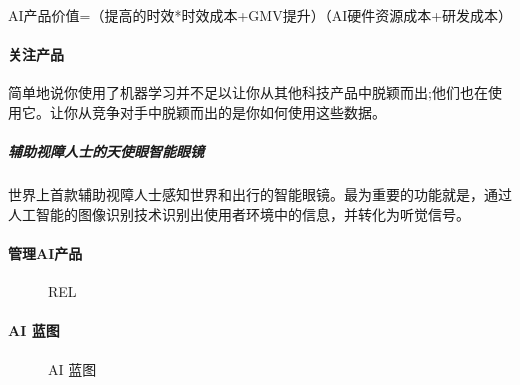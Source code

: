 \documentclass[letterpaper,10pt,english]{sphinxmanual}
\begin{document}
AI产品价值=（提高的时效*时效成本+GMV提升）\sphinxhyphen{}（AI硬件资源成本+研发成本）


\paragraph{关注产品}
\label{\detokenize{chapter_introduction/AI_Product:id8}}
简单地说你使用了机器学习并不足以让你从其他科技产品中脱颖而出;他们也在使用它。让你从竞争对手中脱颖而出的是你如何使用这些数据。
%
\begin{footnote}[247]\sphinxAtStartFootnote
{}
%
\end{footnote}


\subparagraph{辅助视障人士的天使眼智能眼镜}
\label{\detokenize{chapter_introduction/AI_Product:id9}}
世界上首款辅助视障人士感知世界和出行的智能眼镜。最为重要的功能就是，通过人工智能的图像识别技术识别出使用者环境中的信息，并转化为听觉信号。
%
\begin{footnote}[248]\sphinxAtStartFootnote
{}
%
\end{footnote}


\paragraph{管理AI产品}
\label{\detokenize{chapter_introduction/AI_Product:id10}}
\begin{figure}[H]
\centering
\capstart

\noindent{}
\caption{REL}\label{\detokenize{chapter_introduction/AI_Product:id20}}\end{figure}


\paragraph{AI 蓝图}
\label{\detokenize{chapter_introduction/AI_Product:id11}}
\begin{figure}[H]
\centering
\capstart

\noindent{}
\caption{AI
蓝图\sphinxfootnotemark[249]}\label{\detokenize{chapter_introduction/AI_Product:id21}}\end{figure}
%
\begin{footnotetext}[249]\sphinxAtStartFootnote
{}
%
\end{footnotetext}\ignorespaces 
\end{document}
